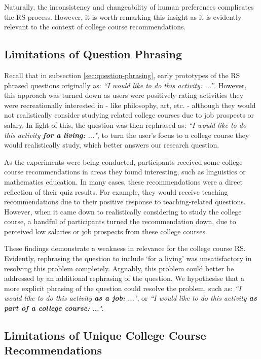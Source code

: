 Naturally, the inconsistency and changeability of human preferences complicates the RS process.
However, it is worth remarking this insight as it is evidently relevant to the context of 
college course recommendations.

\subsection{Limitations of Question Phrasing}

Recall that in subsection \ref{sec:question-phrasing},
early prototypes of the RS phrased questions originally as:
\emph{``I would like to do this activity: ...''}.
However, this approach was turned down as users were positively rating activities they were recreationally 
interested in - like philosophy, art, etc. - although they would not realistically consider studying related 
college courses due to job prospects or salary.
In light of this, the question was then rephrased as: \emph{``I would like to do this activity \textbf{for a living:} ..."},
to turn the user's focus to a college course they would realistically study,
which better answers our research question.

As the experiments were being conducted, participants 
received some college course recommendations in areas they found interesting,
such as linguistics or mathematics education.
In many cases, these recommendations were a direct reflection of their quiz results.
For example, they would receive teaching recommendations due to their positive response to teaching-related questions.
However, when it came down to realistically considering to study the college course,
a handful of participants turned the recommendation down,
due to perceived low salaries or job prospects from these college courses.

These findings demonstrate a weakness in relevance for the college course RS.
Evidently, rephrasing the question to include `for a living' was unsatisfactory in 
resolving this problem completely.
Arguably, this problem could better be addressed by an additional rephrasing of the question.
We hypothesise that a more explicit phrasing of the question could resolve the problem, such as:
\emph{``I would like to do this activity \textbf{as a job:} ..."}, or 
\emph{``I would like to do this activity \textbf{as part of a college course:} ..."}.

\subsection{Limitations of Unique College Course Recommendations}

